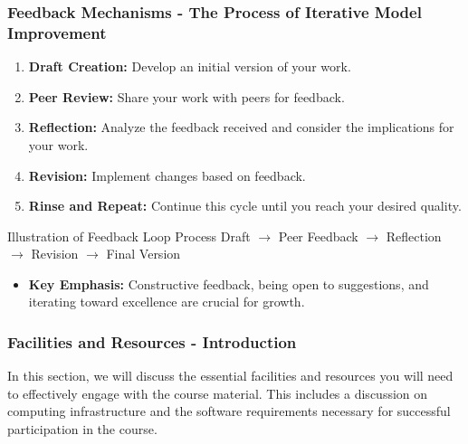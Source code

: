 \documentclass[aspectratio=169]{beamer}
\begin{document}
\begin{frame}[fragile]
    \frametitle{Feedback Mechanisms - The Process of Iterative Model Improvement}
    
    \begin{enumerate}
        \item \textbf{Draft Creation:} Develop an initial version of your work.
        \item \textbf{Peer Review:} Share your work with peers for feedback.
        \item \textbf{Reflection:} Analyze the feedback received and consider the implications for your work.
        \item \textbf{Revision:} Implement changes based on feedback.
        \item \textbf{Rinse and Repeat:} Continue this cycle until you reach your desired quality.
    \end{enumerate}
    
    \begin{block}{Illustration of Feedback Loop Process}
        Draft $\rightarrow$ Peer Feedback $\rightarrow$ Reflection $\rightarrow$ Revision $\rightarrow$ Final Version
    \end{block}
    
    \begin{itemize}
        \item \textbf{Key Emphasis:} Constructive feedback, being open to suggestions, and iterating toward excellence are crucial for growth.
    \end{itemize}
\end{frame}

\begin{frame}[fragile]
    \frametitle{Facilities and Resources - Introduction}
    In this section, we will discuss the essential facilities and resources you will need to effectively engage with the course material. This includes a discussion on computing infrastructure and the software requirements necessary for successful participation in the course.
\end{frame}
\end{document}

